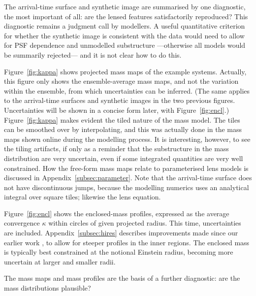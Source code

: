 The arrival-time surface and synthetic image are summarised by one
diagnostic, the most important of all: are the lensed features
satisfactorily reproduced?  This diagnostic remains a judgment call by
modellers.  A useful quantitative criterion for whether the synthetic
image is consistent with the data would need to allow for PSF
dependence and unmodelled substructure ---otherwise all models would
be summarily rejected--- and it is not clear how to do this.

Figure~\ref{fig:kappa} shows projected mass maps of the example
systems.  Actually, this figure only shows the ensemble-average mass
maps, and not the variation within the ensemble, from which
uncertainties can be inferred.  (The same applies to the arrival-time
surfaces and synthetic images in the two previous figures.
Uncertainties will be shown in a concise form later, with
Figure~\ref{fig:encl}.)  Figure~\ref{fig:kappa} makes evident the
tiled nature of the mass model.  The tiles can be smoothed over by
interpolating, and this was actually done in the mass maps shown
online during the modelling process.  It is interesting, however, to
see the tiling artifacts, if only as a reminder that the substructure
in the mass distribution are very uncertain, even if some integrated
quantities are very well constrained.  How the free-form mass maps
relate to parameterised lens models is discussed in
Appendix~\ref{subsec:parameter}.  Note that the arrival-time surface
does not have discontinuous jumps, because the modelling numerics uses
an analytical integral over square tiles; likewise the lens equation.

Figure~\ref{fig:encl} shows the enclosed-mass profiles,
expressed as the average convergence $\kappa$ within circles of given
projected radius.  This time, uncertainties are included.
Appendix~\ref{subsec:hires} describes improvements made since our
earlier work \citep{2015MNRAS.447.2170K}, to allow for steeper
profiles in the inner regions.  The enclosed mass is typically best
constrained at the notional Einstein radius, becoming more uncertain
at larger and smaller radii.

The mass maps and mass profiles are the basis of a further diagnostic:
are the mass distributions plausible?

